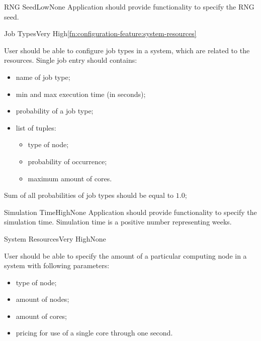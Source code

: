 	\begin{functional}{\gls{RNG} Seed}{Low}{None}
		\label{fn:configuration-feature:rng-seed}
		{
			Application should provide functionality to specify the \gls{RNG} seed.
		}
	\end{functional}

	\begin{functional}{Job Types}{Very High}{\ref{fn:configuration-feature:system-resources}}
		\label{fn:configuration-feature:job-types}
		{
			User should be able to configure job types in a system, which are related to the resources. Single job entry should contains:
			\begin{itemize}
				\item name of job type;
				\item min and max execution time (in seconds);
				\item probability of a job type;
				\item
				{
					list of tuples:
					\begin{itemize}
						\item type of node;
						\item probability of occurrence;
						\item maximum amount of cores.
					\end{itemize}
				}
			\end{itemize}
			Sum of all probabilities of job types should be equal to $1.0$;
		}
	\end{functional}

	\begin{functional}{Simulation Time}{High}{None}
		\label{fn:configuration-feature:simulation-time}
		{
			Application should provide functionality to specify the simulation time. Simulation time is a positive number representing weeks. 
		}
	\end{functional}

	\begin{functional}{System Resources}{Very High}{None}
		\label{fn:configuration-feature:system-resources}
		{
			User should be able to specify the amount of a particular \gls{computing node} in a system with following parameters:
			\begin{itemize}
				\item type of node;
				\item amount of nodes;
				\item amount of cores;
				\item pricing for use of a single core through one second.
			\end{itemize}
		}
	\end{functional}

